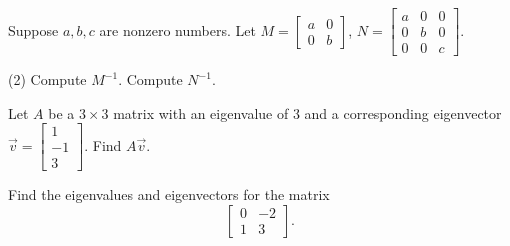 \documentclass{ximera}
\begin{document}
\begin{exercise}%
    Suppose $a, b, c$ are nonzero numbers. Let
    $M=\left[ 
        \begin{smallmatrix}
            a & 0 \\
            0 & b
        \end{smallmatrix}
    \right]$,
    $N=\left[ 
        \begin{smallmatrix}
            a & 0 & 0 \\
            0 & b & 0 \\
            0 & 0 & c
        \end{smallmatrix}
    \right]$.
    \begin{tasks}(2)
        \task Compute $M^{-1}$.
        \task Compute $N^{-1}$.
    \end{tasks}
\end{exercise}

\begin{exercise}[easy]
    Let $A$ be a $3 \times 3$ matrix with an eigenvalue of 3 and a corresponding eigenvector $\vec{v} = \left[ \begin{smallmatrix} 1 \\ -1 \\ 3 \end{smallmatrix} \right]$. Find $A \vec{v}$.
\end{exercise}

\begin{exercise}%
    Find the eigenvalues and eigenvectors for the matrix
    \[ 
        \begin{bmatrix} 
            0 & -2 \\ 
            1 & 3
        \end{bmatrix}. 
    \]
\end{exercise}
\end{document}
